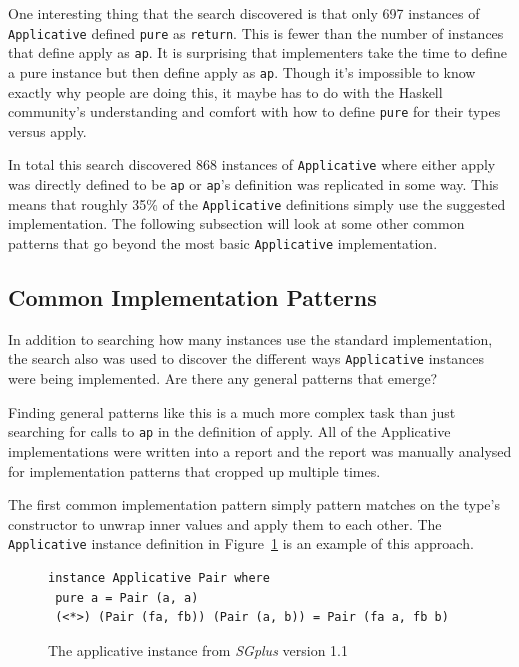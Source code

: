 One interesting thing that the search discovered is that only 697 instances of\\ \texttt{Applicative} defined \texttt{pure} as \texttt{return}. This is fewer than the number of instances that define apply as \texttt{ap}. It is surprising that implementers take the time to define a pure instance but then define apply as \texttt{ap}. Though it's impossible to know exactly why people are doing this, it maybe has to do with the Haskell community's understanding and comfort with how to define \texttt{pure} for their types versus apply. 

In total this search discovered 868 instances of \texttt{Applicative} where either apply was directly defined to be \texttt{ap} or \texttt{ap}'s definition was replicated in some way. This means that roughly 35\% of the \texttt{Applicative} definitions simply use the suggested implementation. The following subsection will look at some other common patterns that go beyond the most basic \texttt{Applicative} implementation.

\subsection{Common Implementation Patterns}

In addition to searching how many instances use the standard implementation, the search also was used to discover the different ways \texttt{Applicative} instances were being implemented. Are there any general patterns that emerge?

Finding general patterns like this is a much more complex task than just searching for calls to \texttt{ap} in the definition of apply. All of the Applicative implementations were written into a report and the report was manually analysed for implementation patterns that cropped up multiple times. 

The first common implementation pattern simply pattern matches on the type's constructor to unwrap inner values and apply them to each other. The \texttt{Applicative} instance definition in Figure~\ref{sgplusPair} is an example of this approach. 

\begin{figure}[t]
\begin{lstlisting}
instance Applicative Pair where
 pure a = Pair (a, a)
 (<*>) (Pair (fa, fb)) (Pair (a, b)) = Pair (fa a, fb b)
\end{lstlisting}
\caption{The applicative instance from \textit{SGplus} version 1.1}
\label{sgplusPair}
\end{figure}

